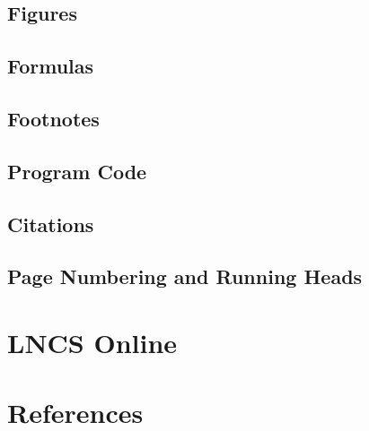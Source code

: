 \documentclass[runningheads,a4paper]{llncs}
\begin{document}
\subsection{Figures}





\subsection{Formulas}




\subsection{Footnotes}



\subsection{Program Code}


\subsection{Citations}


\subsection{Page Numbering and Running Heads}


\section{LNCS Online}




\section{References}
\end{document}
